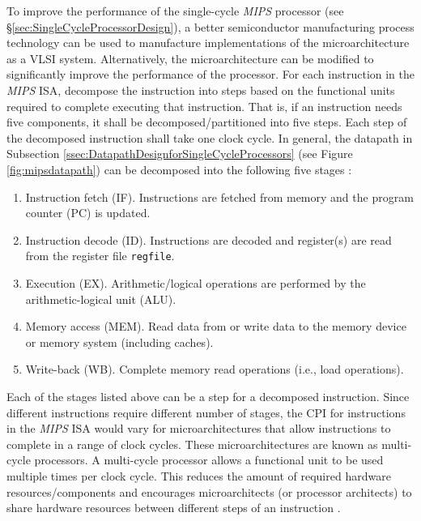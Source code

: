 To improve the performance of the single-cycle {\it MIPS} processor (see \S\ref{sec:SingleCycleProcessorDesign}), a better semiconductor manufacturing process technology can be used to manufacture implementations of the microarchitecture as a VLSI system. Alternatively, the microarchitecture can be modified to significantly improve the performance of the processor. For each instruction in the {\it MIPS} ISA, decompose the instruction into steps based on the functional units required to complete executing that instruction. That is, if an instruction needs five components, it shall be decomposed/partitioned into five steps. Each step of the decomposed instruction shall take one clock cycle. In general, the datapath in Subsection \ref{ssec:DatapathDesignforSingleCycleProcessors} (see Figure \ref{fig:mipsdatapath}) can be decomposed into the following five stages \cite{Patterson2005}: \vspace{-0.3cm}
\begin{enumerate} \itemsep -4pt
\item Instruction fetch (IF). Instructions are fetched from memory and the program counter (PC) is updated.
\item Instruction decode (ID). Instructions are decoded and register(s) are read from the register file {\tt regfile}.
\item Execution (EX). Arithmetic/logical operations are performed by the arithmetic-logical unit (ALU).
\item Memory access (MEM). Read data from or write data to the memory device or memory system (including caches).
\item Write-back (WB). Complete memory read operations (i.e., load operations).
\end{enumerate}

Each of the stages listed above can be a step for a decomposed instruction. Since different instructions require different number of stages, the CPI for instructions in the {\it MIPS} ISA would vary for microarchitectures that allow instructions to complete in a range of clock cycles. These microarchitectures are known as multi-cycle processors. A multi-cycle processor allows a functional unit to be used multiple times per clock cycle. This reduces the amount of required hardware resources/components and encourages microarchitects (or processor architects) to share hardware resources between different steps of an instruction \cite{Patterson2005}. \\

